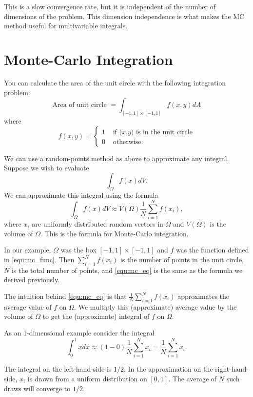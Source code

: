 This is a slow convergence rate, but it is independent of the number of dimensions of the problem. 
This dimension independence is what makes the MC method useful for multivariable integrals.

\section*{Monte-Carlo Integration}

You can calculate the area of the unit circle with the following integration problem:
\[
\mbox{Area of unit circle } = \int_{[-1,1]\times[-1,1]} f(x,y) dA
\]
where
\begin{equation}\label{equ:mc_func}
f(x,y) = \begin{cases} 1 &\mbox{ if $(x$,$y)$ is in the unit circle} \\ 0 &\mbox{ otherwise.} \end{cases}
\end{equation}

We can use a random-points method as above to approximate any integral.
Suppose we wish to evaluate
\[
\int_\Omega f(x) dV.
\]
We can approximate this integral using the formula
\begin{equation}\label{equ:mc_eq}
\int_\Omega f(x) dV \approx V(\Omega) \frac{1}{N} \sum_{i=1}^N f(x_i),
\end{equation}
where $x_i$ are uniformly distributed random vectors in $\Omega$ and $V(\Omega)$ is the volume of $\Omega$.
This is the formula for Monte-Carlo integration. 


In our example, $\Omega$ was the box $[-1,1] \times [-1,1]$ and $f$ was the function defined in \eqref{equ:mc_func}.
Then $\sum_{i=1}^N f(x_i)$ is the number of points in the unit circle, $N$ is the total number of points, and \eqref{equ:mc_eq} is the same as the formula we derived previously.

The intuition behind \eqref{equ:mc_eq} is that $\frac{1}{N} \sum_{i=1}^N f(x_i)$ approximates the average value of $f$ on $\Omega$.
We multiply this (approximate) average value by the volume of $\Omega$ to get the (approximate) integral of $f$ on $\Omega$.

As an 1-dimensional example consider the integral 
\[
\int_0^1 x dx \approx (1-0)\frac{1}{N} \sum_{i=1}^N x_i=\frac{1}{N} \sum_{i=1}^N x_i.
\]

The integral on the left-hand-side is $1/2$. 
In the approximation on the right-hand-side, $x_i$ is drawn from a uniform distribution on $[0,1]$. 
The average of $N$ such draws will converge to $1/2$. 

